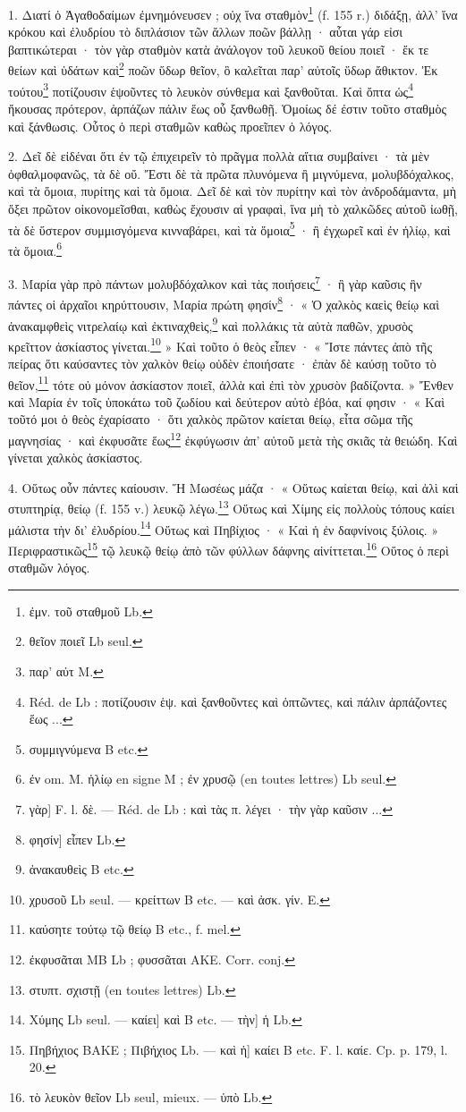 \documentclass[landscape, a4paper, 11pt, oneside, polutonikogreek, french]{article}
\begin{document}
\bigskip

1. Διατί ὁ Ἀγαθοδαίμων ἐμνημόνευσεν ; οὐχ ἵνα σταθμὸν\footnote{ἐμν. τοῦ σταθμοῦ Lb.} (f. 155 r.) διδάξῃ, ἀλλ' ἵνα κρόκου καὶ ἐλυδρίου τὸ διπλάσιον τῶν ἄλλων ποῶν βάλλῃ · αὗται γάρ εἰσι βαπτικώτεραι · τὸν γὰρ σταθμὸν κατὰ ἀνάλογον τοῦ λευκοῦ θείου ποιεῖ · ἔκ τε θείων καὶ ὑδάτων καὶ\footnote{θεῖον ποιεῖ Lb seul.} ποῶν ὕδωρ θεῖον, ὃ καλεῖται παρ' αὐτοῖς ὕδωρ ἄθικτον. Ἐκ τούτου\footnote{παρ' αὐτ M.} ποτίζουσιν ἑψοῦντες τὸ λευκὸν σύνθεμα καὶ ξανθοῦται. Καὶ ὄπτα ὡς\footnote{Réd. de Lb : ποτίζουσιν ἑψ. καὶ ξανθοῦντες καὶ ὀπτῶντες, καὶ πάλιν ἁρπάζοντες ἕως ...} ἤκουσας πρότερον, ἁρπάζων πάλιν ἕως οὗ ξανθωθῇ. Ὁμοίως δέ ἐστιν τοῦτο σταθμὸς καὶ ξάνθωσις. Οὗτος ὁ περὶ σταθμῶν καθὼς προεῖπεν ὁ λόγος.

2. Δεῖ δὲ εἰδέναι ὅτι ἐν τῷ ἐπιχειρεῖν τὸ πρᾶγμα πολλὰ αἴτια συμβαίνει · τὰ μὲν ὀφθαλμοφανῶς, τὰ δὲ οὔ. Ἔστι δὲ τὰ πρῶτα πλυνόμενα ἢ μιγνύμενα, μολυβδόχαλκος, καὶ τὰ ὅμοια, πυρίτης καὶ τὰ ὅμοια. Δεῖ δὲ καὶ τὸν πυρίτην καὶ τὸν ἀνδροδάμαντα, μὴ ὄξει πρῶτον οἰκονομεῖσθαι, καθὼς ἔχουσιν αἱ γραφαὶ, ἵνα μὴ τὸ χαλκῶδες αὐτοῦ ἰωθῇ, τὰ δὲ ὕστερον συμμισγόμενα κινναβάρει, καὶ τὰ ὅμοια\footnote{συμμιγνύμενα B etc.} · ἢ ἐγχωρεῖ καὶ ἐν ἡλίῳ, καὶ τὰ ὅμοια.\footnote{ἐν om. M. ἡλίῳ en signe M ; ἐν χρυσῷ (en toutes lettres) Lb seul.}

3. Μαρία γὰρ πρὸ πάντων μολυβδόχαλκον καὶ τὰς ποιήσεις\footnote{γὰρ] F. l. δὲ. --- Réd. de Lb : καὶ τὰς π. λέγει · τὴν γὰρ καῦσιν ...} · ἢ γὰρ καῦσις ἣν πάντες οἱ ἀρχαῖοι κηρύττουσιν, Μαρία πρώτη φησίν\footnote{φησίν] εἶπεν Lb.} · « Ὁ χαλκὸς καεὶς θείῳ καὶ ἀνακαμφθεὶς νιτρελαίῳ καὶ ἐκτιναχθεὶς,\footnote{ἀνακαυθεὶς B etc.} καὶ πολλάκις τὰ αὐτὰ παθῶν, χρυσὸς κρεῖττον ἀσκίαστος γίνεται.\footnote{χρυσοῦ Lb seul. --- κρείττων B etc. --- καὶ ἀσκ. γίν. E.} » Καὶ τοῦτο ὁ θεὸς εἶπεν · « Ἴστε πάντες ἀπὸ τῆς πείρας ὅτι καύσαντες τὸν χαλκὸν θείῳ οὐδὲν ἐποιήσατε · ἐπὰν δὲ καύσῃ τοῦτο τὸ θεῖον,\footnote{καύσητε τούτῳ τῷ θείῳ B etc., f. mel.} τότε οὐ μόνον ἀσκίαστον ποιεῖ, ἀλλὰ καὶ ἐπὶ τὸν χρυσὸν βαδίζοντα. » Ἔνθεν καὶ Μαρία ἐν τοῖς ὑποκάτω τοῦ ζωδίου καὶ δεύτερον αὐτὸ ἐβόα, καί φησιν · « Καὶ τοῦτό μοι ὁ θεὸς ἐχαρίσατο · ὅτι χαλκὸς πρῶτον καίεται θείῳ, εἶτα σῶμα τῆς μαγνησίας · καὶ ἐκφυσᾶτε ἕως\footnote{ἐκφυσᾶται MB Lb ; φυσσᾶται AKE. Corr. conj.} ἐκφύγωσιν ἀπ' αὐτοῦ μετὰ τὴς σκιᾶς τὰ θειώδη. Καὶ γίνεται χαλκὸς ἀσκίαστος.

4. Οὕτως οὖν πάντες καίουσιν. Ἥ Μωσέως μάζα · « Οὕτως καίεται θείῳ, καὶ ἀλὶ καὶ στυπτηρίᾳ, θείῳ (f. 155 v.) λευκῷ λέγω.\footnote{στυπτ. σχιστῇ (en toutes lettres) Lb.} Οὕτως καὶ Χίμης εἰς πολλοὺς τόπους καίει μάλιστα τὴν δι' ἐλυδρίου.\footnote{Χύμης Lb seul. --- καίει] καὶ B etc. --- τὴν] ἡ Lb.} Οὕτως καὶ Πηβίχιος · « Καὶ ἡ ἐν δαφνίνοις ξύλοις. » Περιφραστικῶς\footnote{Πηβήχιος BAKE ; Πιβήχιος Lb. --- καὶ ἡ] καίει B etc. F. l. καίε. Cp. p. 179, l. 20.} τῷ λευκῷ θείῳ ἀπὸ τῶν φύλλων δάφνης αἰνίττεται.\footnote{τὸ λευκὸν θεῖον Lb seul, mieux. --- ὑπὸ Lb.} Οὕτος ὁ περὶ σταθμῶν λόγος.
\end{document}
